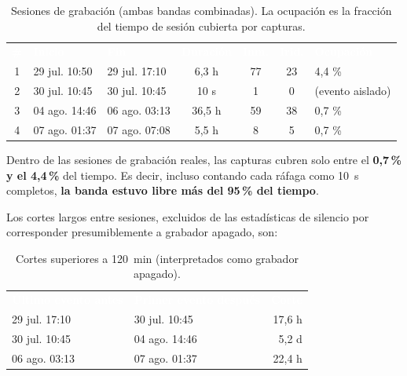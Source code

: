 \begin{table}[h]
    \centering
    \renewcommand{\arraystretch}{1.4}
    \begin{tabularx}{\textwidth}{c l l c c c X}
        \rowcolor{deyposcolor}
        \textbf{\textcolor{white}{\#}} & \textbf{\textcolor{white}{Inicio}} & \textbf{\textcolor{white}{Fin}} & \textbf{\textcolor{white}{Duración}} & \textbf{\textcolor{white}{Inm.}} & \textbf{\textcolor{white}{Irid.}} & \textbf{\textcolor{white}{Ocupación}} \\
        1 & 29 jul. 10:50 & 29 jul. 17:10 & 6,3 h  & 77 & 23 & 4,4 \% \\
        \rowcolor[gray]{0.95}
        2 & 30 jul. 10:45 & 30 jul. 10:45 & 10 s   & 1  & 0  & (evento aislado) \\
        3 & 04 ago. 14:46 & 06 ago. 03:13 & 36,5 h & 59 & 38 & 0,7 \% \\
        \rowcolor[gray]{0.95}
        4 & 07 ago. 01:37 & 07 ago. 07:08 & 5,5 h  & 8  & 5  & 0,7 \% \\
        \bottomrule
    \end{tabularx}
    \caption{Sesiones de grabación (ambas bandas combinadas). La ocupación es la fracción del tiempo de sesión cubierta por capturas.}
    \label{tab:sesiones}
\end{table}

\begin{tcolorbox}[colback=deyposcolor!5, colframe=deyposcolor, title=Dato clave: ocupación de banda muy baja]
Dentro de las sesiones de grabación reales, las capturas cubren solo entre el \textbf{0,7\,\% y el 4,4\,\%} del tiempo. Es decir, incluso contando cada ráfaga como \SI{10}{\second} completos, \textbf{la banda estuvo libre más del 95\,\% del tiempo}.
\end{tcolorbox}

Los cortes largos entre sesiones, excluidos de las estadísticas de silencio por corresponder presumiblemente a grabador apagado, son:

\begin{table}[h]
    \centering
    \renewcommand{\arraystretch}{1.3}
    \begin{tabularx}{0.8\textwidth}{l l r}
        \rowcolor{deyposcolor}
        \textbf{\textcolor{white}{Último evento antes}} & \textbf{\textcolor{white}{Primer evento después}} & \textbf{\textcolor{white}{Corte}} \\
        29 jul. 17:10 & 30 jul. 10:45 & 17,6 h \\
        \rowcolor[gray]{0.95}
        30 jul. 10:45 & 04 ago. 14:46 & 5,2 d \\
        06 ago. 03:13 & 07 ago. 01:37 & 22,4 h \\
        \bottomrule
    \end{tabularx}
    \caption{Cortes superiores a \SI{120}{\minute} (interpretados como grabador apagado).}
\end{table}

